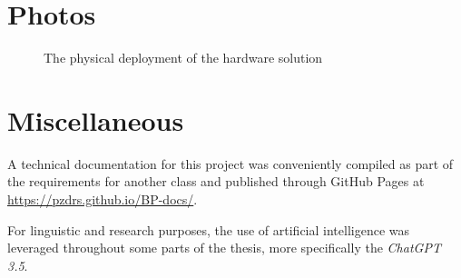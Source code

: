 \documentclass[FM,BP,EN,fonts]{tulthesis}
\begin{document}
\newpage

\section{Photos}

\begin{figure}[H]
    \centering
    \caption{The physical deployment of the hardware solution}
    \label{fig:physical-incar-deployment}
\end{figure}

\section{Miscellaneous}
A technical documentation for this project was conveniently compiled as part of the requirements for another class and published through GitHub Pages at \href{https://pzdrs.github.io/BP-docs/}{https://pzdrs.github.io/BP-docs/}.

\vspace*{\fill}

For linguistic and research purposes, the use of artificial intelligence was leveraged throughout some parts of the thesis, more specifically the \textit{ChatGPT 3.5}.
\end{document}
